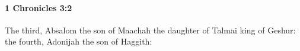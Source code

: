 
		\paragraph{1 Chronicles 3:2} %
			\label{1CHRONICLES-3-2}

			The third, Absalom the son of Maachah the daughter of Talmai king of Geshur: the fourth, Adonijah the son of Haggith:


